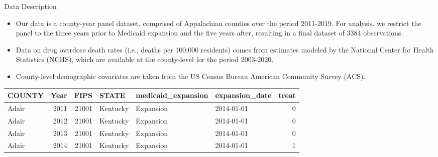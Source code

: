 \documentclass[
  ignorenonframetext,
]{beamer}
\providecommand{\tightlist}{%
  \setlength{\itemsep}{0pt}\setlength{\parskip}{0pt}}
\begin{document}
\begin{frame}{Data Description}
\protect\hypertarget{data-description}{}
\begin{itemize}
\tightlist
\item
  Our data is a county-year panel dataset, comprised of Appalachian
  counties over the period 2011-2019. For analysis, we restrict the
  panel to the three years prior to Medicaid expansion and the five
  years after, resulting in a final dataset of 3384 observations.
\item
  Data on drug overdose death rates (i.e., deaths per 100,000 residents)
  comes from estimates modeled by the National Center for Health
  Statistics (NCHS), which are available at the county-level for the
  period 2003-2020.
\item
  County-level demographic covariates are taken from the US Census
  Bureau American Community Survey (ACS).
\end{itemize}

\begin{longtable}[]{@{}lrrlllr@{}}
\toprule()
COUNTY & Year & FIPS & STATE & medicaid\_expansion & expansion\_date &
treat \\
\midrule()
\endhead
Adair & 2011 & 21001 & Kentucky & Expansion & 2014-01-01 & 0 \\
Adair & 2012 & 21001 & Kentucky & Expansion & 2014-01-01 & 0 \\
Adair & 2013 & 21001 & Kentucky & Expansion & 2014-01-01 & 0 \\
Adair & 2014 & 21001 & Kentucky & Expansion & 2014-01-01 & 1 \\
\bottomrule()
\end{longtable}
\end{frame}
\end{document}
